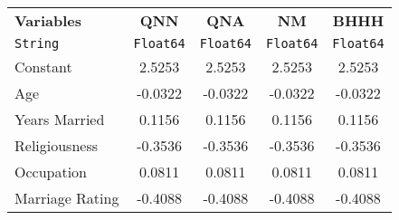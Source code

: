 \begin{tabular}{lcccc}
  \hline
  \textbf{Variables} & \textbf{QNN} & \textbf{QNA} & \textbf{NM} & \textbf{BHHH} \\
  \texttt{String} & \texttt{Float64} & \texttt{Float64} & \texttt{Float64} & \texttt{Float64} \\\hline
  Constant & 2.5253 & 2.5253 & 2.5253 & 2.5253 \\
  Age & -0.0322 & -0.0322 & -0.0322 & -0.0322 \\
  Years Married & 0.1156 & 0.1156 & 0.1156 & 0.1156 \\
  Religiousness & -0.3536 & -0.3536 & -0.3536 & -0.3536 \\
  Occupation & 0.0811 & 0.0811 & 0.0811 & 0.0811 \\
  Marriage Rating & -0.4088 & -0.4088 & -0.4088 & -0.4088 \\\hline
\end{tabular}
